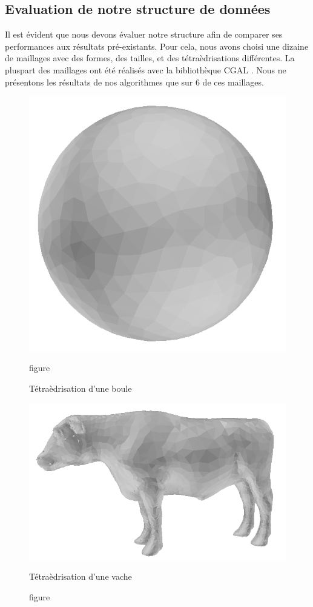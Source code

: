 \documentclass[a4paper,11pt,openany]{article}
\begin{document}
\subsection{Evaluation de notre structure de données}
\noindent
Il est évident que nous devons évaluer notre structure afin de comparer ses performances aux résultats pré-existants. Pour cela, nous avons choisi une dizaine de maillages avec des formes, des tailles, et des tétraèdrisations différentes. La pluspart des maillages ont été réalisés avec la bibliothèque CGAL \cite{CGAL}. Nous ne présentons les résultats de nos algorithmes que sur 6 de ces maillages.
\begin{figure}[H]
\centering
\begin{minipage}{.5\textwidth}
  \centering
  \includegraphics[scale=0.2]{Images/ball}
  \caption{figure}{Tétraèdrisation d'une boule}
  \label{fig:ball}
\end{minipage}%
\begin{minipage}{.5\textwidth}
  \centering
  \includegraphics[scale=0.2]{Images/cow}
  \caption{figure}{Tétraèdrisation d'une vache}
  \label{fig:cow}
\end{minipage}
\end{figure}
\end{document}
